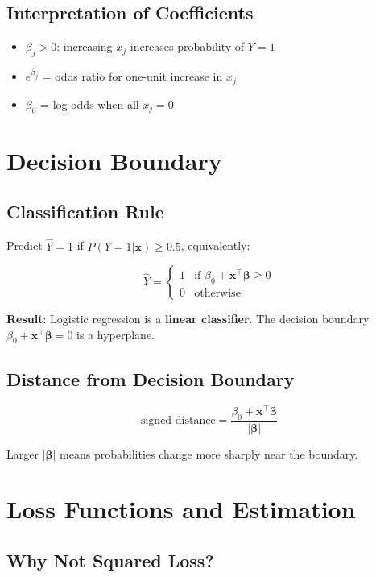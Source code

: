 \documentclass[main.tex]{subfiles}
\begin{document}
\subsection{Interpretation of Coefficients}

\begin{itemize}
    \item $\beta_j > 0$: increasing $x_j$ increases probability of $Y = 1$
    \item $e^{\beta_j}$ = odds ratio for one-unit increase in $x_j$
    \item $\beta_0$ = log-odds when all $x_j = 0$
\end{itemize}

\section{Decision Boundary}

\subsection{Classification Rule}

Predict $\hat{Y} = 1$ if $P(Y=1|\mathbf{x}) \geq 0.5$, equivalently:

$$\boxed{\hat{Y} = \begin{cases} 1 & \text{if } \beta_0 + \mathbf{x}^\top\boldsymbol{\beta} \geq 0 \\ 0 & \text{otherwise} \end{cases}}$$

\textbf{Result}: Logistic regression is a \textbf{linear classifier}. The decision boundary $\beta_0 + \mathbf{x}^\top\boldsymbol{\beta} = 0$ is a hyperplane.

\subsection{Distance from Decision Boundary}

$$\text{signed distance} = \frac{\beta_0 + \mathbf{x}^\top\boldsymbol{\beta}}{|\boldsymbol{\beta}|}$$

Larger $|\boldsymbol{\beta}|$ means probabilities change more sharply near the boundary.

\section{Loss Functions and Estimation}

\subsection{Why Not Squared Loss?}
\end{document}
